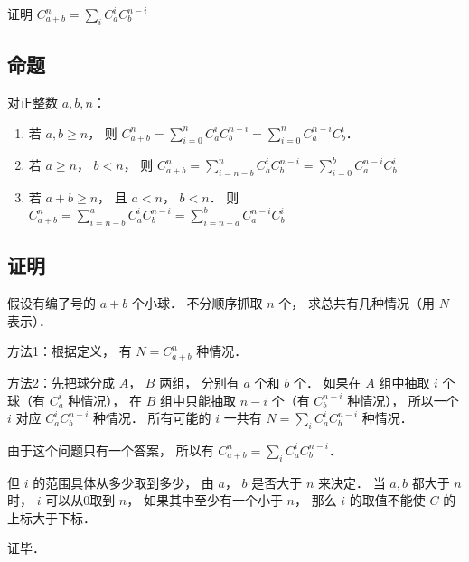 
证明 $C_{a + b}^n = \sum\limits_i {C_a^iC_b^{n - i}} $ 

\subsection{命题}
对正整数 $a,b,n$：
\begin{enumerate}
\item 若 $a,b \geqslant n$，  则 $C_{a + b}^n = \sum\limits_{i = 0}^n {C_a^iC_b^{n - i}}  = \sum\limits_{i = 0}^n {C_a^{n - i}C_b^i} $． 
\item 若 $a \geqslant n$，  $b < n$，   则  $C_{a + b}^n = \sum\limits_{i = n - b}^n {C_a^iC_b^{n - i}}  = \sum\limits_{i = 0}^b {C_a^{n - i}C_b^i} $ 
\item 若 $a + b \geqslant n$，   且 $a < n$，   $b < n$．  则  $C_{a + b}^n = \sum\limits_{i = n - b}^a {C_a^iC_b^{n - i}}  = \sum\limits_{i = n - a}^b {C_a^{n - i}C_b^i} $ 
\end{enumerate}

\subsection{证明}

假设有编了号的 $a+b$ 个小球． 不分顺序抓取 $n$ 个， 求总共有几种情况（用 $N$ 表示）．

方法1：根据定义， 有 $N = C_{a + b}^n$ 种情况．

方法2：先把球分成 $A$，  $B$ 两组， 分别有 $a$ 个和 $b$ 个． 如果在 $A$ 组中抽取 $i$ 个球（有 $C_a^i$ 种情况）， 在 $B$ 组中只能抽取  $n - i$ 个（有 $C_b^{n - i}$ 种情况）， 所以一个 $i$ 对应 $C_a^iC_b^{n - i}$ 种情况． 所有可能的 $i$ 一共有 $N = \sum\limits_i {C_a^iC_b^{n - i}} $ 种情况．

由于这个问题只有一个答案， 所以有 $C_{a + b}^n = \sum\limits_i {C_a^iC_b^{n - i}} $． 

但 $i$ 的范围具体从多少取到多少， 由 $a$，  $b$ 是否大于 $n$ 来决定． 当 $a,b$ 都大于 $n$ 时， $i$ 可以从0取到 $n$，  如果其中至少有一个小于 $n$，  那么 $i$ 的取值不能使 $C$ 的上标大于下标．

证毕．

